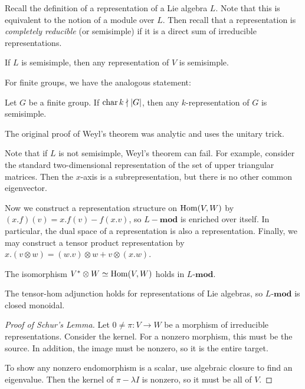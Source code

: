 \documentclass[twoside, 10pt]{article}
\begin{document}
    Recall the definition of a representation of a Lie algebra $L$. Note that
    this is equivalent to the notion of a module over $L$. Then recall that a
    representation is \textit{completely reducible} (or semisimple) if it is a
    direct sum of irreducible representations.

    \begin{thm}[Weyl] If $L$ is semisimple, then any representation of $V$ is
    semisimple.  \end{thm}
    
    For finite groups, we have the analogous statement:

    \begin{thm}[Maschke] Let $G$ be a finite group. If $\operatorname{char} k
    \nmid \lvert G\rvert$, then any $k$-representation of $G$ is semisimple.
\end{thm}
    
    \begin{rmk} The original proof of Weyl's theorem was analytic and uses the
    unitary trick.  \end{rmk}

    Note that if $L$ is not semisimple, Weyl's theorem can fail. For example,
    consider the standard two-dimensional representation of the set of upper
    triangular matrices. Then the $x$-axis is a subrepresentation, but there is
    no other common eigenvector.

    Now we construct a representation structure on $\operatorname{Hom}(V,W)$ by $(x.f)(v) =
    x.f(v) - f(x.v)$, so $L-\mathbf{mod}$ is enriched over itself. In
    particular, the dual space of a representation is also a representation.
    Finally, we may construct a tensor product representation by $x.(v \otimes
    w) = (w.v)\otimes w + v \otimes (x.w)$.

    \begin{rmk} The isomorphism $V^* \otimes W \simeq \operatorname{Hom}(V,W)$ holds in
    $L$-$\mathbf{mod}$.  \end{rmk}

    \begin{rmk} The tensor-hom adjunction holds for representations of Lie
    algebras, so $L$-$\mathbf{mod}$ is closed monoidal.  \end{rmk}

    \begin{proof}[Proof of Schur's Lemma] Let $0 \neq \pi:V \to W$ be a
        morphism of irreducible representations. Consider the kernel. For a
        nonzero morphism, this must be the source. In addition, the image must
        be nonzero, so it is the entire target.

        To show any nonzero endomorphism is a scalar, use algebraic closure to
    find an eigenvalue. Then the kernel of $\pi - \lambda I$ is nonzero, so it
must be all of $V$.  \end{proof}
\end{document}
